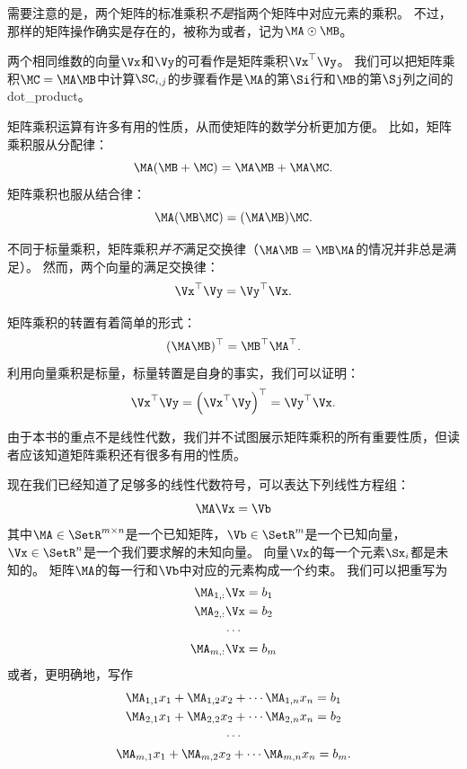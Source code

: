 需要注意的是，两个矩阵的标准乘积\emph{不是}指两个矩阵中对应元素的乘积。
不过，那样的矩阵操作确实是存在的，被称为或者，记为$\MA\odot\MB$。


两个相同维数的向量$\Vx$和$\Vy$的可看作是矩阵乘积$\Vx^\top\Vy$。
我们可以把矩阵乘积$\MC=\MA\MB$中计算$\SC_{i,j}$的步骤看作是$\MA$的第$\Si$行和$\MB$的第$\Sj$列之间的\gls{dot_product}。


矩阵乘积运算有许多有用的性质，从而使矩阵的数学分析更加方便。
比如，矩阵乘积服从分配律：
\begin{equation}
    \MA(\MB+\MC)=\MA\MB +\MA\MC.
\end{equation}
矩阵乘积也服从结合律：
\begin{equation}
\MA(\MB\MC)=(\MA\MB)\MC.
\end{equation}




不同于标量乘积，矩阵乘积\emph{并不}满足交换律（$\MA\MB=\MB\MA$的情况并非总是满足）。
然而，两个向量的满足交换律：
\begin{equation}
\Vx^\top\Vy=\Vy^\top\Vx.
\label{eq:2.8}
\end{equation}


矩阵乘积的转置有着简单的形式：
\begin{equation}
(\MA\MB)^\top=\MB^\top\MA^\top.
\end{equation}
利用向量乘积是标量，标量转置是自身的事实，我们可以证明：
\begin{equation}
    \Vx^\top \Vy = \left(\Vx^\top \Vy \right)^\top = \Vy^\top \Vx.
\end{equation}


由于本书的重点不是线性代数，我们并不试图展示矩阵乘积的所有重要性质，但读者应该知道矩阵乘积还有很多有用的性质。


现在我们已经知道了足够多的线性代数符号，可以表达下列线性方程组：
\begin{equation}
\MA\Vx=\Vb
\label{eq:2.11}
\end{equation}
其中$\MA\in \SetR^{m\times n}$是一个已知矩阵，$\Vb\in\SetR^m$是一个已知向量，$\Vx\in\SetR^n$是一个我们要求解的未知向量。
向量$\Vx$的每一个元素$\Sx_i$都是未知的。
矩阵$\MA$的每一行和$\Vb$中对应的元素构成一个约束。
我们可以把重写为
\begin{gather}
\MA_{1,:}\Vx=b_1\\
\MA_{2,:}\Vx=b_2 \\
\cdots \\
\MA_{m,:}\Vx=b_m
\end{gather}
或者，更明确地，写作
\begin{gather}
    \MA_{1,1}x_1+\MA_{1,2}x_2+\cdots \MA_{1,n}x_n = b_1\\
    \MA_{2,1}x_1+\MA_{2,2}x_2+\cdots \MA_{2,n}x_n = b_2\\
    \cdots\\
    \MA_{m,1}x_1+\MA_{m,2}x_2+\cdots \MA_{m,n}x_n = b_m.
\end{gather}


